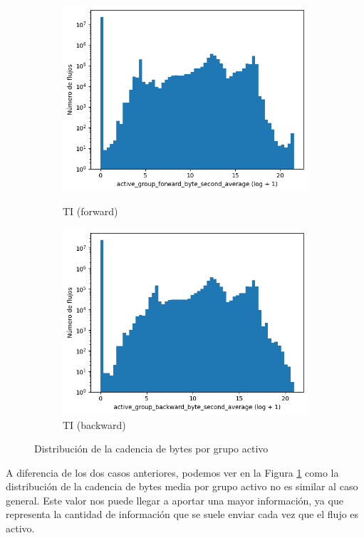 \begin{figure}[H]
\begin{subfigure}[b]{0.26\textwidth}
        \includegraphics[width=\linewidth]{media/packet_pincer_toniot/active_group_forward_byte_second_average_log_x_log_y.png}
        \caption{TI (forward)}
        \includegraphics[width=\linewidth]{media/packet_pincer_toniot/active_group_backward_byte_second_average_log_x_log_y.png}
        \caption{TI (backward)}
    \end{subfigure}
       \caption{Distribución de la cadencia de bytes por grupo activo}
       \label{fig:packet_pincer_active_group_byte_second_average}
\end{figure}

A diferencia de los dos casos anteriores, podemos ver en la Figura \ref{fig:packet_pincer_active_group_byte_second_average} como la distribución de la cadencia de bytes media por grupo activo no es similar al caso general. Este valor nos puede llegar a aportar una mayor información, ya que representa la cantidad de información que se suele enviar cada vez que el flujo es activo.

